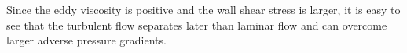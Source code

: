 Since the eddy viscosity is positive and the wall shear stress is larger, it is easy to see that the turbulent flow separates later than laminar flow and can overcome larger adverse pressure gradients. 

%

